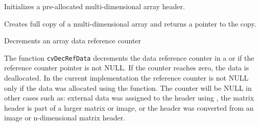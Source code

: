 Initializes a pre-allocated multi-dimensional array header.


\begin{description}
\end{description}

\label{CloneMatND}

Creates full copy of a multi-dimensional array and returns a pointer to the copy.


\begin{description}
\end{description}


\label{DecRefData}

Decrements an array data reference counter


\begin{description}
\end{description}

The function \texttt{cvDecRefData} decrements the data reference counter in a  or
 if the reference counter pointer
is not NULL. If the counter reaches zero, the data is deallocated. In the
current implementation the reference counter is not NULL only if the data
was allocated using the  function. The counter will be NULL in other cases such as:
external data was assigned to the header using , the matrix
header is part of a larger matrix or image, or the header was converted from an image or n-dimensional matrix header. 



